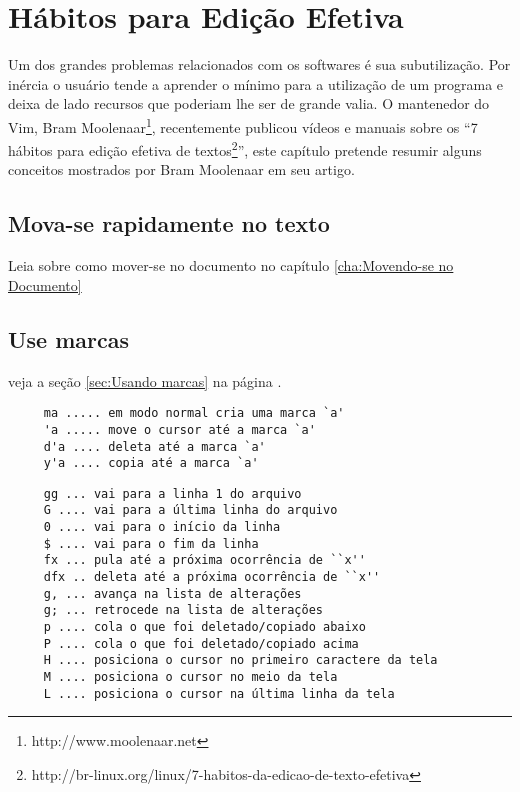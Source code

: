 
\chapter{Hábitos para Edição Efetiva}
\label{cha:Hábitos para edição efetiva}


Um dos grandes problemas relacionados com os softwares é sua subutilização. Por
inércia o usuário tende a aprender o mínimo para a utilização de um programa e
deixa de lado recursos que poderiam lhe ser de grande valia. O mantenedor do
Vim, Bram Moolenaar\footnote{http://www.moolenaar.net}, recentemente publicou vídeos
e manuais sobre os ``7 hábitos para edição efetiva de
textos\footnote{http://br-linux.org/linux/7-habitos-da-edicao-de-texto-efetiva}'',
este capítulo pretende resumir alguns conceitos mostrados por Bram Moolenaar em
seu artigo.

\section{Mova-se rapidamente no texto}
\label{sec:Mova-se rapidamente no texto}

Leia sobre como mover-se no documento no capítulo \ref{cha:Movendo-se no Documento}


\section{Use marcas}
veja a seção \ref{sec:Usando marcas} na página \pageref{sec:Usando marcas}.

\begin{verbatim}
     ma ..... em modo normal cria uma marca `a'
     'a ..... move o cursor até a marca `a'
     d'a .... deleta até a marca `a'
     y'a .... copia até a marca `a'
\end{verbatim}



\begin{verbatim}
     gg ... vai para a linha 1 do arquivo
     G .... vai para a última linha do arquivo
     0 .... vai para o início da linha
     $ .... vai para o fim da linha
     fx ... pula até a próxima ocorrência de ``x''
     dfx .. deleta até a próxima ocorrência de ``x''
     g, ... avança na lista de alterações
     g; ... retrocede na lista de alterações
     p .... cola o que foi deletado/copiado abaixo
     P .... cola o que foi deletado/copiado acima
     H .... posiciona o cursor no primeiro caractere da tela
     M .... posiciona o cursor no meio da tela
     L .... posiciona o cursor na última linha da tela
\end{verbatim}

